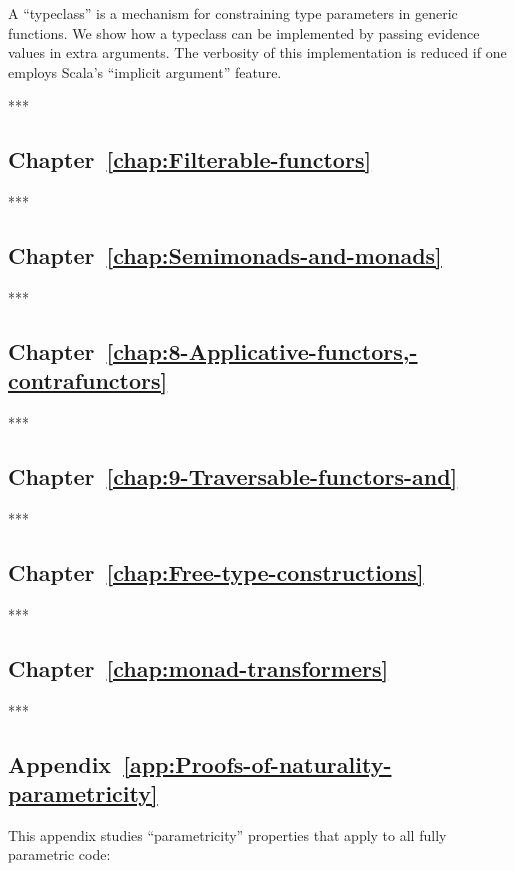 A \textsf{``}typeclass\textsf{''} is a mechanism for constraining type parameters
in generic functions. We show how a typeclass can be implemented by
passing evidence values in extra arguments. The verbosity of this
implementation is reduced if one employs Scala\textsf{'}s \textsf{``}implicit argument\textsf{''}
feature. 

{*}{*}{*}

\subsection{Chapter~\ref{chap:Filterable-functors}}

{*}{*}{*}

\subsection{Chapter~\ref{chap:Semimonads-and-monads}}

{*}{*}{*}

\subsection{Chapter~\ref{chap:8-Applicative-functors,-contrafunctors}}

{*}{*}{*}

\subsection{Chapter~\ref{chap:9-Traversable-functors-and}}

{*}{*}{*}

\subsection{Chapter~\ref{chap:Free-type-constructions}}

{*}{*}{*}

\subsection{Chapter~\ref{chap:monad-transformers}}

{*}{*}{*}

\subsection{Appendix~\ref{app:Proofs-of-naturality-parametricity}}

This appendix studies \textsf{``}parametricity\textsf{''} properties that apply to
all fully parametric code:

